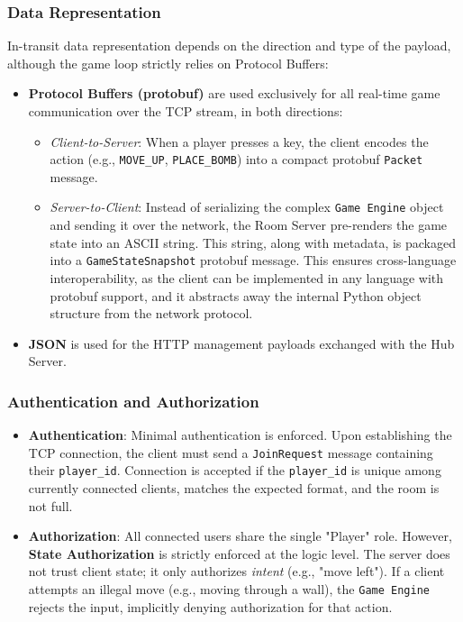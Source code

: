 \subsubsection{Data Representation}

In-transit data representation depends on the direction and type of the payload, although the game loop strictly relies on Protocol Buffers:

\begin{itemize}
    \item \textbf{Protocol Buffers (protobuf)} are used exclusively for all real-time game communication over the TCP stream, in both directions:
    \begin{itemize}
        \item \textit{Client-to-Server}: When a player presses a key, the client encodes the action (e.g., \texttt{MOVE\_UP}, \texttt{PLACE\_BOMB}) into a compact protobuf \texttt{Packet} message.
        \item \textit{Server-to-Client}: Instead of serializing the complex \texttt{Game Engine} object and sending it over the network, the Room Server pre-renders the game state into an ASCII string. 
        This string, along with metadata, is packaged into a \texttt{GameStateSnapshot} protobuf message. 
        This ensures cross-language interoperability, as the client can be implemented in any language with protobuf support, and it abstracts away the internal Python object structure from the network protocol.
    \end{itemize}
    
    \item \textbf{JSON} is used for the HTTP management payloads exchanged with the Hub Server.
\end{itemize}

\subsubsection{Authentication and Authorization}

\begin{itemize}
    \item \textbf{Authentication}: Minimal authentication is enforced. 
    Upon establishing the TCP connection, the client must send a \texttt{JoinRequest} message containing their \texttt{player\_id}.
    Connection is accepted if the \texttt{player\_id} is unique among currently connected clients, matches the expected format, and the room is not full.
    
    \item \textbf{Authorization}: All connected users share the single "Player" role. 
    However, \textbf{State Authorization} is strictly enforced at the logic level. The server does not trust client state; it only authorizes \textit{intent} (e.g., "move left"). 
    If a client attempts an illegal move (e.g., moving through a wall), the \texttt{Game Engine} rejects the input, implicitly denying authorization for that action.
\end{itemize}

